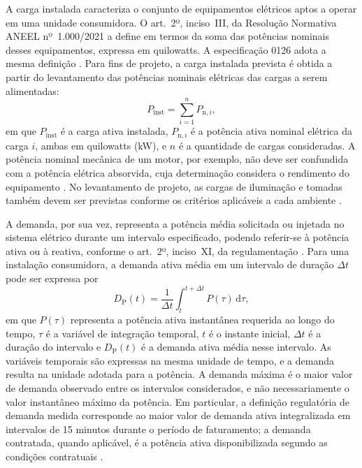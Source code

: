 A carga instalada caracteriza o conjunto de equipamentos elétricos aptos a operar em uma unidade consumidora. O art.~2º, inciso~III, da Resolução Normativa ANEEL nº~1.000/2021 a define em termos da soma das potências nominais desses equipamentos, expressa em quilowatts. A especificação 0126 adota a mesma definição \cite[art.~2º, inciso~III]{aneel1000}\cite[item~7.1.3]{enel0126}. Para fins de projeto, a carga instalada prevista é obtida a partir do levantamento das potências nominais elétricas das cargas a serem alimentadas:
\begin{equation}
 P_{\mathrm{inst}} = \sum_{i=1}^{n} P_{\mathrm{n},i},
 \label{eq:carga-instalada}
\end{equation}
em que $P_{\mathrm{inst}}$ é a carga ativa instalada, $P_{\mathrm{n},i}$ é a potência ativa nominal elétrica da carga $i$, ambas em quilowatts (kW), e $n$ é a quantidade de cargas consideradas. A potência nominal mecânica de um motor, por exemplo, não deve ser confundida com a potência elétrica absorvida, cuja determinação considera o rendimento do equipamento \cite[seção~1.8.2]{mamede2017}. No levantamento de projeto, as cargas de iluminação e tomadas também devem ser previstas conforme os critérios aplicáveis a cada ambiente \cite[seção~1.8.2.2]{mamede2017}.

A demanda, por sua vez, representa a potência média solicitada ou injetada no sistema elétrico durante um intervalo especificado, podendo referir-se à potência ativa ou à reativa, conforme o art.~2º, inciso~XI, da regulamentação \cite{aneel1000}. Para uma instalação consumidora, a demanda ativa média em um intervalo de duração $\Delta t$ pode ser expressa por
\begin{equation}
 D_{\mathrm{P}}(t)=\frac{1}{\Delta t}\int_{t}^{t+\Delta t}P(\tau)\,\mathrm{d}\tau,
 \label{eq:demanda-media}
\end{equation}
em que $P(\tau)$ representa a potência ativa instantânea requerida ao longo do tempo, $\tau$ é a variável de integração temporal, $t$ é o instante inicial, $\Delta t$ é a duração do intervalo e $D_{\mathrm{P}}(t)$ é a demanda ativa média nesse intervalo. As variáveis temporais são expressas na mesma unidade de tempo, e a demanda resulta na unidade adotada para a potência. A demanda máxima é o maior valor de demanda observado entre os intervalos considerados, e não necessariamente o valor instantâneo máximo da potência. Em particular, a definição regulatória de demanda medida corresponde ao maior valor de demanda ativa integralizada em intervalos de 15 minutos durante o período de faturamento; a demanda contratada, quando aplicável, é a potência ativa disponibilizada segundo as condições contratuais \cite[art.~2º, incisos~XII e~XIII]{aneel1000}.

